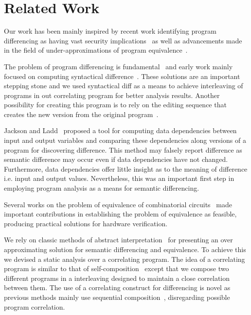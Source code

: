 \section{Related Work} 

Our work has been mainly inspired by recent work identifying program differencing as having vast security implications~\cite{BrumleyPoosankamSongZheng08,SongSunZhang09} as well as advancements made in the field of under-approximations of program equivalence~\cite{GodlinStrichman09, KawaguchiLahiriRebelo10, DwyerElbaumPerson08, EnglerRamos11}.

The problem of program differencing is fundamental~\cite{Hoare69} and early work mainly focused on computing syntactical difference~\cite{HuntMcIlroy75}. These solutions are an important stepping stone and we used syntactical diff as a means to achieve interleaving of programs in out correlating program for better analysis results. Another possibility for creating this program is to rely on the editing sequence that creates the new version from the original program~\cite{Horwitz90}.

Jackson and Ladd~\cite{JacksonLadd94} proposed a tool for computing data dependencies between input and output variables and comparing these dependencies along versions of a program for discovering difference. This method may falsely report difference as semantic difference may occur even if data dependencies have not changed. Furthermore, data dependencies offer little insight as to the meaning of difference i.e. input and output values. Nevertheless, this was an important first step in employing program analysis as a means for semantic differencing.

Several works on the problem of equivalence of combinatorial circuits~\cite{KuehlmannKrohm97,BraytonChatterjeeMishchenkoEen06, ClarkeKroening03} made important contributions in establishing the problem of equivalence as feasible, producing practical solutions for hardware verification.

We rely on classic methods of abstract interpretation~\cite{CousotCousot77} for presenting an over approximating solution for semantic differencing and equivalence. To achieve this we devised a static analysis over a correlating program. The idea of a correlating program is similar to that of self-composition~\cite{AikenTerauchi05} except that we compose two different programs in a interleaving designed to maintain a close correlation between them. The use of a correlating construct for differencing is novel as previous methods mainly use sequential composition~\cite{GodlinStrichman09, DwyerElbaumPerson08, EnglerRamos11}, disregarding possible program correlation.


